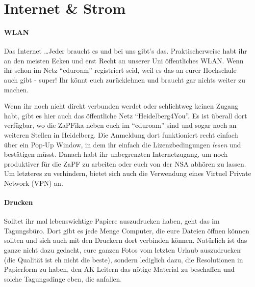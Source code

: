 
\section{Internet \& Strom}
\paragraph{WLAN}
Das Internet \dots Jeder braucht es und bei uns gibt's das. Praktischerweise habt ihr an den meisten Ecken und erst Recht an unserer Uni öffentliches WLAN. Wenn ihr schon im Netz ``eduroam'' registriert seid, weil es das an eurer Hochschule auch gibt - super! Ihr könnt euch zurücklehnen und braucht gar nichts weiter zu machen.

Wenn ihr noch nicht direkt verbunden werdet oder schlichtweg keinen Zugang habt, gibt es hier auch das öffentliche Netz ``Heidelberg4You''. Es ist überall dort verfügbar, wo die ZaPFika neben euch im ``eduroam'' sind und sogar noch an weiteren Stellen in Heidelberg. Die Anmeldung dort funktioniert recht einfach über ein Pop-Up Window, in dem ihr einfach die Lizenzbedingungen \textit{lesen} und bestätigen müsst. Danach habt ihr unbegrenzten Internetzugang, um noch produktiver für die ZaPF zu arbeiten oder euch von der NSA abhören zu lassen. Um letzteres zu verhindern, bietet sich auch die Verwendung eines Virtuel Private Network (VPN) an.

\paragraph{Drucken}
Solltet ihr mal lebenswichtige Papiere auszudrucken haben, geht das im Tagungsbüro. Dort gibt es jede Menge Computer, die eure Dateien öffnen können sollten und sich auch mit den Druckern dort verbinden können. Natürlich ist das ganze nicht dazu gedacht, eure ganzen Fotos vom letzten Urlaub auszudrucken (die Qualität ist eh nicht die beste), sondern lediglich dazu, die Resolutionen in Papierform zu haben, den AK Leitern das nötige Material zu beschaffen und solche Tagungsdinge eben, die anfallen.

